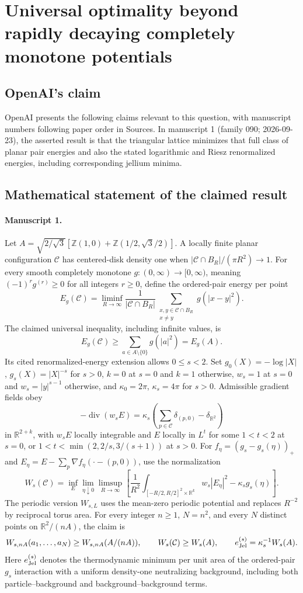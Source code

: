 \documentclass[11pt]{article}
\begin{document}
\section*{Universal optimality beyond rapidly decaying completely monotone potentials}

\subsection{OpenAI's claim}
OpenAI presents the following claims relevant to this question, with manuscript numbers following paper order in Sources. In manuscript 1 (family 090; 2026-09-23), the asserted result is that the triangular lattice minimizes that full class of planar pair energies and also the stated logarithmic and Riesz renormalized energies, including corresponding jellium minima.

\subsection{Mathematical statement of the claimed result}
\paragraph{Manuscript 1.}
Let $A=\sqrt{2/\sqrt3}[\mathbb Z(1,0)+\mathbb Z(1/2,\sqrt3/2)]$. A locally finite planar configuration $\mathcal C$ has centered-disk density one when $|\mathcal C\cap B_R|/(\pi R^2)\to1$. For every smooth completely monotone $g:(0,\infty)\to[0,\infty)$, meaning $(-1)^rg^{(r)}\ge0$ for all integers $r\ge0$, define the ordered-pair energy per point
\[
 E_g(\mathcal C)=\liminf_{R\to\infty}\frac1{|\mathcal C\cap B_R|}
 \sum_{\substack{x,y\in\mathcal C\cap B_R\\x\ne y}}g(|x-y|^2).
\]
The claimed universal inequality, including infinite values, is
\[
 E_g(\mathcal C)\ge\sum_{a\in A\setminus\{0\}}g(|a|^2)=E_g(A).
\]
Its cited renormalized-energy extension allows $0\le s<2$. Set $g_0(X)=-\log|X|$, $g_s(X)=|X|^{-s}$ for $s>0$, $k=0$ at $s=0$ and $k=1$ otherwise, $w_s=1$ at $s=0$ and $w_s=|y|^{s-1}$ otherwise, and $\kappa_0=2\pi$, $\kappa_s=4\pi$ for $s>0$. Admissible gradient fields obey
\[
 -\operatorname{div}(w_sE)=\kappa_s(\sum_{p\in\mathcal C}\delta_{(p,0)}-\delta_{\mathbb R^2})
\]
in $\mathbb R^{2+k}$, with $w_sE$ locally integrable and $E$ locally in $L^t$ for some $1<t<2$ at $s=0$, or $1<t<\min(2,2/s,3/(s+1))$ at $s>0$. For $f_{\eta}=(g_s-g_s(\eta))_+$ and $E_{\eta}=E-\sum_p\nabla f_{\eta}(\cdot-(p,0))$, use the normalization
\[
 W_s(\mathcal C)=\inf_E\lim_{\eta\downarrow0}\limsup_{R\to\infty}
 \left[\frac1{R^2}\int_{[-R/2,R/2]^2\times\mathbb R^k}w_s|E_{\eta}|^2
                -\kappa_sg_s(\eta)\right].
\]
The periodic version $W_{s,L}$ uses the mean-zero periodic potential and replaces $R^{-2}$ by reciprocal torus area. For every integer $n\ge1$, $N=n^2$, and every $N$ distinct points on $\mathbb R^2/(nA)$, the claim is
\[
 W_{s,nA}(a_1,\ldots,a_N)\ge W_{s,nA}(A/(nA)),\qquad
 W_s(\mathcal C)\ge W_s(A),\qquad
 e_{\rm Jel}^{(s)}=\kappa_s^{-1}W_s(A).
\]
Here $e_{\rm Jel}^{(s)}$ denotes the thermodynamic minimum per unit area of the ordered-pair $g_s$ interaction with a uniform density-one neutralizing background, including both particle--background and background--background terms.
\end{document}

